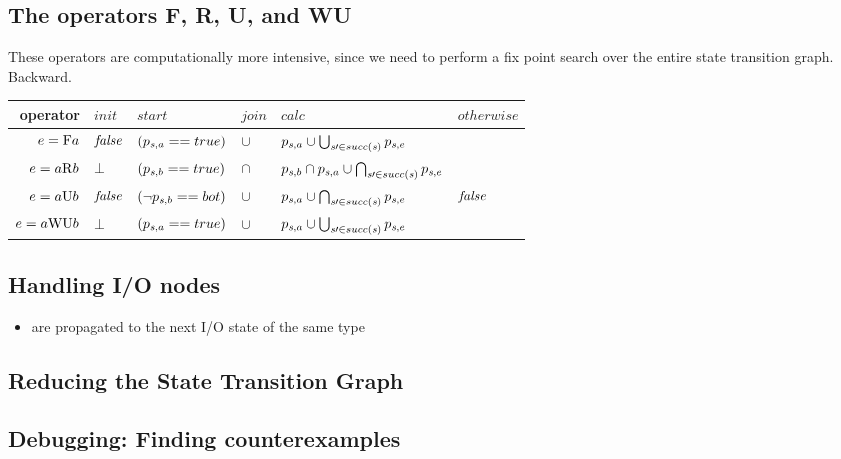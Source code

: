 \subsection{The operators F, R, U, and WU}
These operators are computationally more intensive, since we need to
perform a fix point search over the entire state transition graph. Backward.
\begin{tabular}{rlllll}
\toprule
operator & $\mathit{init}$ & $\mathit{start}$ & $\mathit{join}$ &
$\mathit{calc}$ & $\mathit{otherwise}$ \\\midrule

$e = \mathrm{F} a$  & $\mathit{false}$ & $(p_{\mathit{s},a}==true)$ & $\cup$ & 
$p_{\mathit{s},a}\cup\bigcup_{\mathit{s}\prime\in succ(\mathit{s})}{p_{\mathit{s},e}}$ &\\

$e = a \mathrm{R} b$ & $\bot$ & $(p_{\mathit{s},b}==true)$ & $\cap$ &
$p_{\mathit{s},b} \cap p_{\mathit{s},a} \cup \bigcap_{\mathit{s}\prime\in succ(\mathit{s})}{p_{\mathit{s},e}}$\\

$e = a \mathrm{U} b$ & $\mathit{false}$ & $(\neg p_{\mathit{s},b}==bot)$ &
$\cup$ & $p_{\mathit{s},a} \cup\bigcap_{\mathit{s}\prime\in succ(\mathit{s})}{p_{\mathit{s},e}}$ & $\mathit{false}$\\

$e = a \mathrm{WU} b$ & $\bot$ & $(p_{\mathit{s},a}==true)$ & $\cup$ &
$p_{\mathit{s},a} \cup \bigcup_{\mathit{s}\prime\in succ(\mathit{s})}{p_{\mathit{s},e}}$\\\bottomrule
\end{tabular}


\subsection{Handling I/O nodes}
\begin{itemize}
\item are propagated to the next I/O state of the same type
\end{itemize}

\subsection{Reducing the State Transition Graph}

\subsection{Debugging: Finding counterexamples}